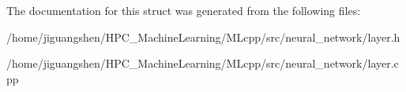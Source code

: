 The documentation for this struct was generated from the following files\-:\begin{DoxyCompactItemize}
\item 
/home/jiguangshen/\-H\-P\-C\-\_\-\-Machine\-Learning/\-M\-Lcpp/src/neural\-\_\-network/layer.\-h\item 
/home/jiguangshen/\-H\-P\-C\-\_\-\-Machine\-Learning/\-M\-Lcpp/src/neural\-\_\-network/layer.\-cpp\end{DoxyCompactItemize}
